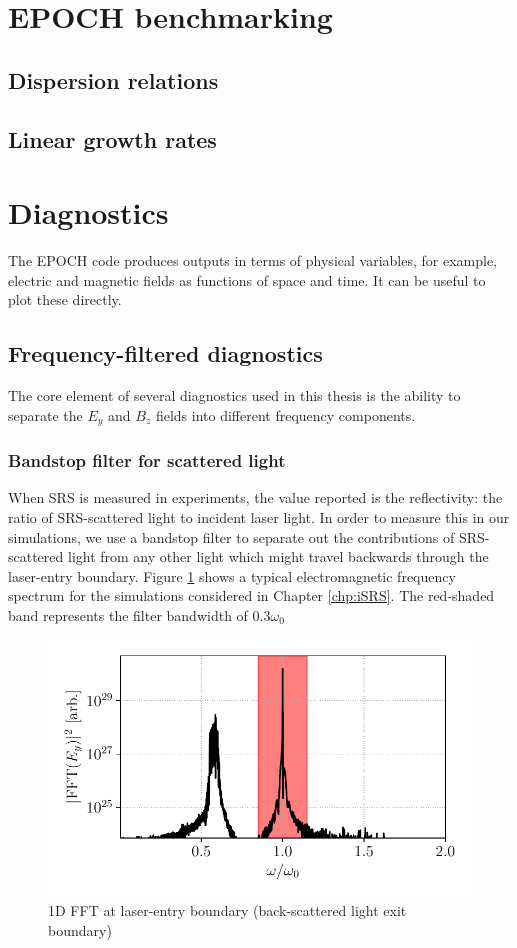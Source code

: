 \section{EPOCH benchmarking}
\subsection{Dispersion relations}
\subsection{Linear growth rates}



\section{Diagnostics}

The EPOCH code produces outputs in terms of physical variables, for example, electric and magnetic fields as functions of space and time. It can be useful to plot these directly.

\subsection{Frequency-filtered diagnostics}
The core element of several diagnostics used in this thesis is the ability to separate the $E_y$ and $B_z$ fields into different frequency components. 

\subsubsection{Bandstop filter for scattered light} When SRS is measured in experiments, the value reported is the reflectivity: the ratio of SRS-scattered light to incident laser light. In order to measure this in our simulations, we use a bandstop filter to separate out the contributions of SRS-scattered light from any other light which might travel backwards through the laser-entry boundary. Figure \ref{fig:bandstop} shows a typical electromagnetic frequency spectrum for the simulations considered in Chapter \ref{chp:iSRS}. The red-shaded band represents the filter bandwidth of $0.3\omega_0$



\begin{figure}[ht]
   \centering
    \includegraphics[width=0.8\columnwidth]{Chapters/C3_Methods/EyFFT1D_filter_bandwidth.pdf}
    \caption{1D FFT at laser-entry boundary (back-scattered light exit boundary)}
    \label{fig:bandstop}
\end{figure}{}

